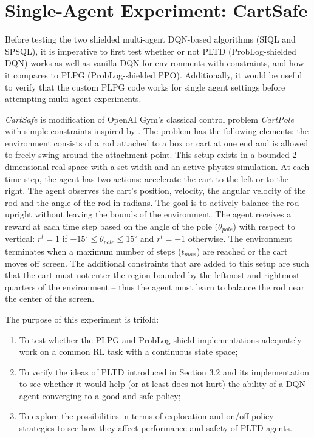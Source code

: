 \section{Single-Agent Experiment: CartSafe} 
\label{appsec:cartsafe_results}

 



Before testing the two shielded multi-agent DQN-based algorithms (SIQL and SPSQL), it is imperative to first test whether or not PLTD (ProbLog-shielded DQN) works as well as vanilla DQN for environments with constraints, and how it compares to PLPG (ProbLog-shielded PPO). Additionally, it would be useful to verify that the custom PLPG code works for single agent settings before attempting multi-agent experiments.

\textit{CartSafe} is modification of OpenAI Gym's classical control problem \textit{CartPole} \citep{brockman1606.01540} with simple constraints inspired by \citet{jemaw2019}. The problem has the following elements: the environment consists of a rod attached to a box or cart at one end and is allowed to freely swing around the attachment point. This setup exists in a bounded 2-dimensional real space with a set width and an active physics simulation. At each time step, the agent has two actions: accelerate the cart to the left or to the right. The agent observes the cart's position, velocity, the angular velocity of the rod and the angle of the rod in radians. The goal is to actively balance the rod upright without leaving the bounds of the environment. The agent receives a reward at each time step based on the angle of the pole ($\theta_{pole}$) with respect to vertical: $r^t=1$ if $-15^\circ\leq\theta_{pole}\leq15^\circ$ and $r^t=-1$ otherwise. The environment terminates when a maximum number of steps ($t_{max}$) are reached or the cart moves off screen. The additional constraints that are added to this setup are such that the cart must not enter the region bounded by the leftmost and rightmost quarters of the environment -- thus the agent must learn to balance the rod near the center of the screen.

The purpose of this experiment is trifold: 
\begin{enumerate}
    \item To test whether the PLPG and ProbLog shield implementations adequately work on a common RL task with a continuous state space;
    \item To verify the ideas of PLTD introduced in Section 3.2 and its implementation to see whether it would help (or at least does not hurt) the ability of a DQN agent converging to a good and safe policy;
    \item To explore the possibilities in terms of exploration and on/off-policy strategies to see how they affect performance and safety of PLTD agents.
\end{enumerate}

